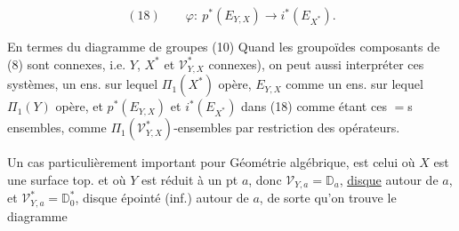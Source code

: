 \[
(18)\qquad \varphi:\ p^*(E_{Y,X})\longrightarrow i^*(E_{X^*}).
\]

En termes du diagramme de groupes
(10) Quand les  groupoïdes composants de
(8) sont connexes, i.e. $Y$, $X^*$ et $\mathcal V^*_{Y,X}$
connexes), on peut aussi interpréter
ces systèmes, 
un ens. sur lequel $\Pi_1(X^*)$ opère, $E_{Y,X}$
comme un ens. sur lequel $\Pi_1(Y)$ opère,
et $p^*(E_{Y,X})$ et $i^*(E_{X^*})$ dans (18) comme
étant ces $=$s ensembles,  comme
$\Pi_1(\mathcal V^*_{Y,X})$-ensembles  par restriction
des opérateurs.


Un cas  particulièrement important
pour   Géométrie algébrique,
est celui où $X$ est une surface
top. et où $Y$ est réduit à un pt $a$,
donc $\mathcal V_{Y,a}=\mathbb D_a$, \uline{disque}  autour de $a$,
et $\mathcal V^*_{Y,a}=\mathbb D^*_0$, disque épointé (inf.) autour
de $a$, de sorte qu'on trouve le diagramme
